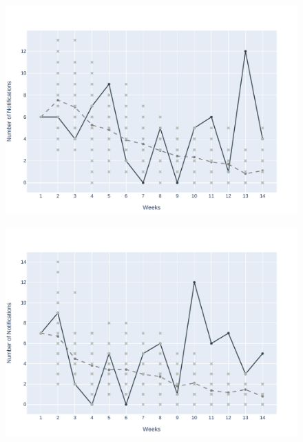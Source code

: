 \begin{figure}[!ht]
	\begin{minipage}[c]{.45\textwidth}
		\centering
		\includegraphics[scale=0.4]{images/experiments-lim/LIM-2019-04-14.pdf} \\
		\vspace{-0.3cm}
	\end{minipage}
	\hspace{0.5cm}
	\begin{minipage}[c]{.45\textwidth}
		\centering
		\includegraphics[scale=0.4]{images/experiments-lim/LIM-2019-05-05.pdf} \\
		\vspace{-0.3cm}

\end{minipage}
\end{figure}
